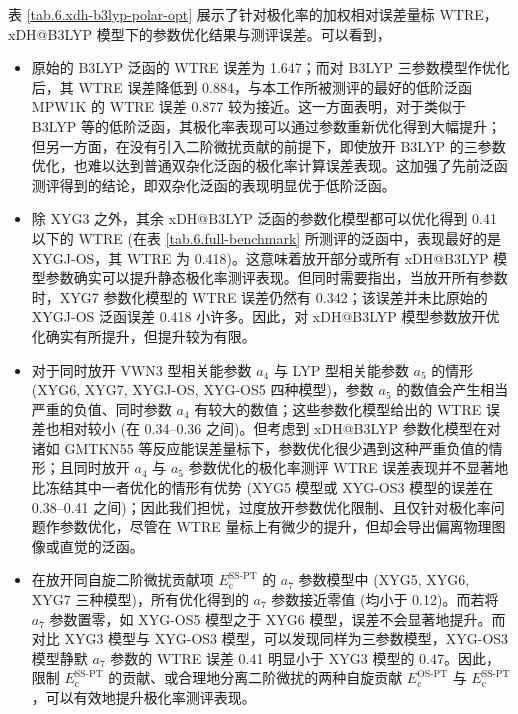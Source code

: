 表 \ref{tab.6.xdh-b3lyp-polar-opt} 展示了针对极化率的加权相对误差量标 WTRE，xDH@B3LYP 模型下的参数优化结果与测评误差。可以看到，
\begin{itemize}[nosep]
    \item 原始的 B3LYP 泛函的 WTRE 误差为 1.647；而对 B3LYP 三参数模型作优化后，其 WTRE 误差降低到 0.884，与本工作所被测评的最好的低阶泛函 MPW1K 的 WTRE 误差 0.877 较为接近。这一方面表明，对于类似于 B3LYP 等的低阶泛函，其极化率表现可以通过参数重新优化得到大幅提升；但另一方面，在没有引入二阶微扰贡献的前提下，即使放开 B3LYP 的三参数优化，也难以达到普通双杂化泛函的极化率计算误差表现。这加强了先前泛函测评得到的结论，即双杂化泛函的表现明显优于低阶泛函。
    \item 除 XYG3 之外，其余 xDH@B3LYP 泛函的参数化模型都可以优化得到 0.41 以下的 WTRE (在表 \ref{tab.6.full-benchmark} 所测评的泛函中，表现最好的是 XYGJ-OS，其 WTRE 为 0.418)。这意味着放开部分或所有 xDH@B3LYP 模型参数确实可以提升静态极化率测评表现。但同时需要指出，当放开所有参数时，XYG7 参数化模型的 WTRE 误差仍然有 0.342；该误差并未比原始的 XYGJ-OS 泛函误差 0.418 小许多。因此，对 xDH@B3LYP 模型参数放开优化确实有所提升，但提升较为有限。
    \item 对于同时放开 VWN3 型相关能参数 $a_4$ 与 LYP 型相关能参数 $a_5$ 的情形 (XYG6, XYG7, XYGJ-OS, XYG-OS5 四种模型)，参数 $a_5$ 的数值会产生相当严重的负值、同时参数 $a_4$ 有较大的数值；这些参数化模型给出的 WTRE 误差也相对较小 (在 0.34--0.36 之间)。但考虑到 xDH@B3LYP 参数化模型在对诸如 GMTKN55 等反应能误差量标下，参数优化很少遇到这种严重负值的情形；且同时放开 $a_4$ 与 $a_5$ 参数优化的极化率测评 WTRE 误差表现并不显著地比冻结其中一者优化的情形有优势 (XYG5 模型或 XYG-OS3 模型的误差在 0.38--0.41 之间)；因此我们担忧，过度放开参数优化限制、且仅针对极化率问题作参数优化，尽管在 WTRE 量标上有微少的提升，但却会导出偏离物理图像或直觉的泛函。
    \item 在放开同自旋二阶微扰贡献项 $E_\mathrm{c}^\text{SS-PT}$ 的 $a_7$ 参数模型中 (XYG5, XYG6, XYG7 三种模型)，所有优化得到的 $a_7$ 参数接近零值 (均小于 0.12)。而若将 $a_7$ 参数置零，如 XYG-OS5 模型之于 XYG6 模型，误差不会显著地提升。而对比 XYG3 模型与 XYG-OS3 模型，可以发现同样为三参数模型，XYG-OS3 模型静默 $a_7$ 参数的 WTRE 误差 0.41 明显小于 XYG3 模型的 0.47。因此，限制 $E_\mathrm{c}^\text{SS-PT}$ 的贡献、或合理地分离二阶微扰的两种自旋贡献 $E_\mathrm{c}^\text{OS-PT}$ 与 $E_\mathrm{c}^\text{SS-PT}$，可以有效地提升极化率测评表现。
\end{itemize}

